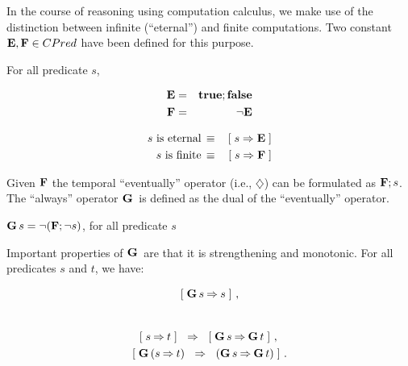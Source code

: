 In the course of reasoning using computation calculus, we make use of
the distinction between infinite (``eternal'') and finite
computations.  Two constant $\mathbf{E}, \mathbf{F} \in CPred$ have been defined for
this purpose. 
\begin{Definition} For all predicate $s$,\\
  \begin{minipage}{0.4\linewidth}
    \begin{eqnarray}
      \mathbf{E} & = & \mathbf{true};\mathbf{false} \label{eq:comp-eternal} \\
      \mathbf{F} & = & \neg \mathbf{E} \label{eq:comp-finite}
    \end{eqnarray}
  \end{minipage}
  \hfill
  \begin{minipage}{0.4\linewidth}
    \begin{eqnarray}
      \textrm{$s$ is eternal} & \, \equiv \, & [\; s \Rightarrow \mathbf{E} \;] \label{eq:comp-s-eternal} \\
      \textrm{$s$ is finite} & \, \equiv\, & [\; s \Rightarrow \mathbf{F} \;] \label{eq:comp-s-finite}
    \end{eqnarray}
  \end{minipage}
\end{Definition}
Given $\mathbf{F}$ the temporal ``eventually'' operator (i.e., $\diamondsuit$)
can be formulated as $\mathbf{F};s$.  The ``always'' operator $\mathbf{G}\,$ is defined
as the dual of the ``eventually'' operator.
\begin{Definition}
  $\mathbf{G}\, s = \neg(\mathbf{F};\neg s)$, for all predicate $s$
\end{Definition}
Important properties of $\mathbf{G}\,$ are that it is strengthening and
monotonic.  For all predicates $s$ and $t$, we have:

  \begin{minipage}{0.3\linewidth}
	\begin{align}
	  \label{eq:g-strengthen}
	  [\; \mathbf{G}\, s \mathbin\Rightarrow s \;]~, \\
	  \nonumber
	\end{align}
  \end{minipage}
  \hfill
  \begin{minipage}{0.5\linewidth}
    \begin{align}
      \label{eq:g-monotonic}
      \ew{s \limp t} \Wide{&\limp} \ew{\G s \limp \G t}~, \\ 
	\ew{ \G (s \limp t) &\Wide{\limp} (\G s \limp \G t) }~.
    \end{align}
  \end{minipage}

